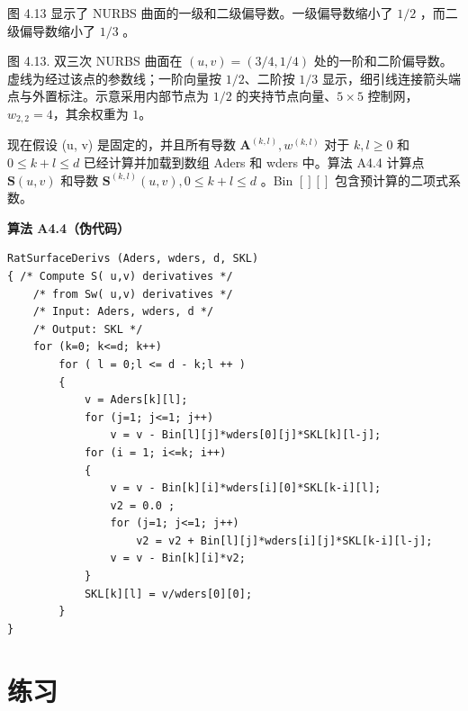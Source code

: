 \documentclass[../main.tex]{subfiles}
\begin{document}
图 4.13 显示了 NURBS 曲面的一级和二级偏导数。一级偏导数缩小了 \(1/2\) ，而二级偏导数缩小了 \(1/3\) 。

\begin{center}
\begin{minipage}{18cm}
\vspace*{.6\baselineskip}
\centering
{}
\par\smallskip
图 4.13. 双三次 NURBS 曲面在 \((u,v)=(3/4,1/4)\) 处的一阶和二阶偏导数。虚线为经过该点的参数线；一阶向量按 \(1/2\)、二阶按 \(1/3\) 显示，细引线连接箭头端点与外置标注。示意采用内部节点为 \(1/2\) 的夹持节点向量、\(5\times5\) 控制网，\(w_{2,2}=4\)，其余权重为 \(1\)。
\end{minipage}
\end{center}

现在假设 (u, v) 是固定的，并且所有导数 \({\mathbf{A}}^{\left( k,l\right) },{w}^{\left( k,l\right) }\) 对于 \(k,l \geq  0\) 和 \(0 \leq  k + l \leq  d\) 已经计算并加载到数组 Aders 和 wders 中。算法 A4.4 计算点 \(\mathbf{S}\left( {u,v}\right)\) 和导数 \({\mathbf{S}}^{\left( k,l\right) }\left( {u,v}\right) ,0 \leq  k + l \leq  d\) 。Bin \(\left\lbrack  \right\rbrack  \left\lbrack  \right\rbrack\) 包含预计算的二项式系数。

\par\medskip\noindent\textbf{算法 A4.4（伪代码）}\par
\begin{verbatim}
RatSurfaceDerivs (Aders, wders, d, SKL)
{ /* Compute S( u,v) derivatives */
    /* from Sw( u,v) derivatives */
    /* Input: Aders, wders, d */
    /* Output: SKL */
    for (k=0; k<=d; k++)
        for ( l = 0;l <= d - k;l ++ )
        {
            v = Aders[k][l];
            for (j=1; j<=1; j++)
                v = v - Bin[l][j]*wders[0][j]*SKL[k][l-j];
            for (i = 1; i<=k; i++)
            {
                v = v - Bin[k][i]*wders[i][0]*SKL[k-i][l];
                v2 = 0.0 ;
                for (j=1; j<=1; j++)
                    v2 = v2 + Bin[l][j]*wders[i][j]*SKL[k-i][l-j];
                v = v - Bin[k][i]*v2;
            }
            SKL[k][l] = v/wders[0][0];
        }
}
\end{verbatim}

\section*{练习}
\end{document}
